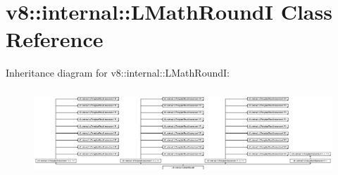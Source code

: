 \hypertarget{classv8_1_1internal_1_1_l_math_round_i}{}\section{v8\+:\+:internal\+:\+:L\+Math\+RoundI Class Reference}
\label{classv8_1_1internal_1_1_l_math_round_i}
Inheritance diagram for v8\+:\+:internal\+:\+:L\+Math\+RoundI\+:\begin{figure}[H]
\begin{center}
\leavevmode
\includegraphics[height=3.271375cm]{classv8_1_1internal_1_1_l_math_round_i}
\end{center}
\end{figure}
